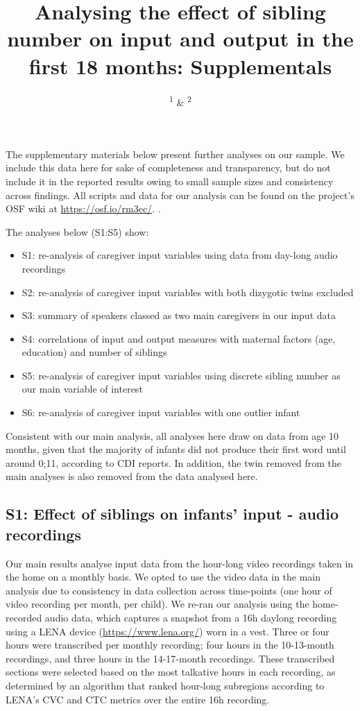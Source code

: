 \documentclass[
  man,mask,floatsintext]{apa6}
\title{Analysing the effect of sibling number on input and output in the first 18 months: Supplementals}
\author{\textsuperscript{1} \& \textsuperscript{2}}
\date{}
\affiliation{\vspace{0.5cm}\textsuperscript{1} \\\textsuperscript{2} }
\providecommand{\tightlist}{%
  \setlength{\itemsep}{0pt}\setlength{\parskip}{0pt}}
\begin{document}
\maketitle

The supplementary materials below present further analyses on our sample. We include this data here for sake of completeness and transparency, but do not include it in the reported results owing to small sample sizes and consistency across findings. All scripts and data for our analysis can be found on the project's OSF wiki at \url{https://osf.io/rm3ec/}. .

The analyses below (S1:S5) show:

\begin{itemize}
\tightlist
\item
  S1: re-analysis of caregiver input variables using data from day-long audio recordings
\item
  S2: re-analysis of caregiver input variables with both dizygotic twins excluded
\item
  S3: summary of speakers classed as two main caregivers in our input data
\item
  S4: correlations of input and output measures with maternal factors (age, education) and number of siblings
\item
  S5: re-analysis of caregiver input variables using discrete sibling number as our main variable of interest
\item
  S6: re-analysis of caregiver input variables with one outlier infant
\end{itemize}

Consistent with our main analysis, all analyses here draw on data from age 10 months, given that the majority of infants did not produce their first word until around 0;11, according to CDI reports. In addition, the twin removed from the main analyses is also removed from the data analysed here.

\hypertarget{s1-effect-of-siblings-on-infants-input---audio-recordings}{%
\subsection{S1: Effect of siblings on infants' input - audio recordings}\label{s1-effect-of-siblings-on-infants-input---audio-recordings}}

Our main results analyse input data from the hour-long video recordings taken in the home on a monthly basis. We opted to use the video data in the main analysis due to consistency in data collection across time-points (one hour of video recording per month, per child). We re-ran our analysis using the home-recorded audio data, which captures a snapshot from a 16h daylong recording using a LENA device (\url{https://www.lena.org/}) worn in a vest. Three or four hours were transcribed per monthly recording; four hours in the 10-13-month recordings, and three hours in the 14-17-month recordings. These transcribed sections were selected based on the most talkative hours in each recording, as determined by an algorithm that ranked hour-long subregions according to LENA's CVC and CTC metrics over the entire 16h recording.
\end{document}
